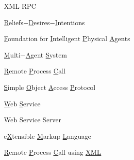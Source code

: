 \begin{listofabbrv}{XML-RPC}
		\item[BDI] \underline{B}eliefs$-$\underline{D}esires$-$\underline{I}ntentions
		\item[FIPA] \underline{F}oundation for \underline{I}ntelligent \underline{P}hysical \underline{A}gents
        \item[MAS] \underline{M}ulti$-$\underline{A}gent \underline{S}ystem
        \item[RPC] \underline{R}emote \underline{P}rocess \underline{C}all
        \item[SOAP] \underline{S}imple \underline{O}bject \underline{A}ccess \underline{P}rotocol
        \item[WS] \underline{W}eb \underline{S}ervice
        \item[WSS] \underline{W}eb \underline{S}ervice \underline{S}erver
        \item[XML] e\underline{X}tensible \underline{M}arkup \underline{L}anguage
        \item[XML-RPC] \underline{R}emote \underline{P}rocess \underline{C}all using \underline{XML}
\end{listofabbrv}
